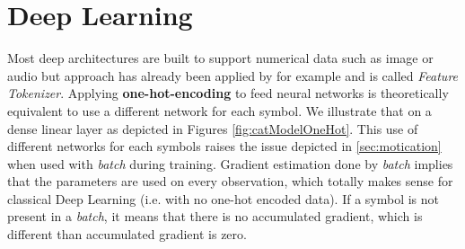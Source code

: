 \section{Deep Learning}\label{deepLearning}




Most deep architectures are built to support numerical data such as image or audio but \ohe approach has already been applied by \cite{RevisitingDeepForTabular} for example and is called \textit{Feature Tokenizer}. Applying \textbf{one-hot-encoding} to feed neural networks is theoretically equivalent to use a different network for each symbol. We illustrate that on a dense linear layer as depicted in Figures \ref{fig:catModelOneHot}. This use of different networks for each symbols raises the issue depicted in \ref{sec:motication} when used with \textit{batch} during training. Gradient estimation done by \textit{batch} implies that the parameters are used on every observation, which totally makes sense for classical Deep Learning (i.e. with no one-hot encoded data). If a symbol is not present in a \textit{batch}, it means that there is no accumulated gradient, which is different than accumulated gradient is zero.




